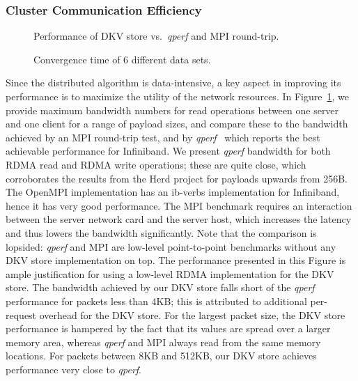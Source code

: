 \subsubsection{Cluster Communication Efficiency}

\begin{figure}[tb] %
  \centering
  \caption{Performance of DKV store vs.\ \textit{qperf} and MPI round-trip.}
  \label{fig-qperf}
\end{figure}

\begin{figure*}[htbp] %
  \centering
  \caption{Convergence time of 6 different data sets.}
  \label{fig-ppx}
\end{figure*}

Since the distributed algorithm is data-intensive, a key aspect in improving
its performance is to maximize the utility of the network resources.
In Figure~\ref{fig-qperf}, we provide maximum bandwidth numbers for
read operations between one server and one client for a range of payload sizes,
and compare these to the bandwidth achieved by an MPI round-trip test,
and by \textit{qperf}~\cite{qperf-mellanox} which reports
the best achievable performance for Infiniband. We present \textit{qperf}
bandwidth for both RDMA read and RDMA write operations; these are quite
close, which corroborates the results from the Herd project for payloads
upwards from 256B.
The OpenMPI implementation has an ib-verbs implementation for Infiniband,
hence it has very good performance.
The MPI benchmark requires an interaction between
the server network card and the server host, which increases the latency and
thus lowers the bandwidth
significantly.
Note that the comparison is
lopsided: \textit{qperf} and MPI are low-level point-to-point benchmarks without
any DKV store implementation on top.
The performance presented in this Figure
is ample justification for using a low-level RDMA
implementation for the DKV store.
The bandwidth achieved by our DKV store falls short
of the \textit{qperf} performance for packets less than 4KB; this is attributed
to additional per-request overhead for the DKV store. For the largest packet
size, the DKV store performance is hampered by the fact that its values
are spread over a larger memory area, whereas \textit{qperf} and MPI always read
from the same memory locations. For packets between 8KB and 512KB, our DKV
store achieves performance very close to \textit{qperf}.

